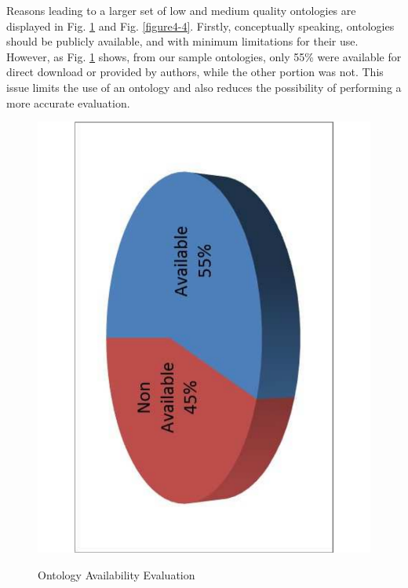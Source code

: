 Reasons leading to a larger set of low and medium quality ontologies are displayed in Fig. \ref{figure4-3} and Fig. \ref{figure4-4}. Firstly, conceptually speaking, ontologies should be publicly available, and with minimum limitations for their use.  However, as Fig. \ref{figure4-3} shows, from our sample ontologies, only 55\% were available for direct download or provided by authors, while the other portion was not. This issue limits the use of an ontology and also reduces the possibility of performing a more accurate evaluation. 


\begin{figure}
	\begin{center}
		\includegraphics[scale=0.4, angle=-90]{figure-chapterIV/fig4-3.pdf}\\
		\caption{Ontology Availability Evaluation}
		\label{figure4-3}
	\end{center}
\end{figure}



